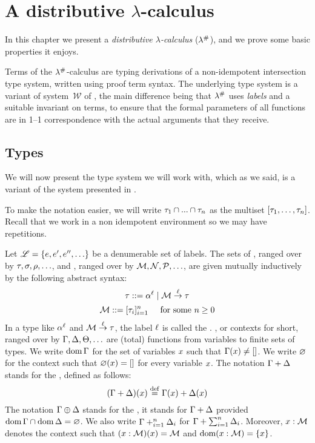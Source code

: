 \chapter{A distributive $\lambda$-calculus}

In this chapter we present a
{\em distributive $\lambda$-calculus} ($\lambda^{\mathtt{\#}}$),
and we prove some basic properties it enjoys.

Terms of the $\lambda^{\mathtt{\#}}$-calculus are typing derivations of a non-idempotent intersection type
system, written using proof term syntax.
The underlying type system is a variant of
system~$\mathcal{W}$ of \cite{bucciarelli2014inhabitation,bucciarelli2017non},
the main difference being that $\lambda^{\mathtt{\#}}$
uses {\em labels} and a suitable invariant on terms,
to ensure that the formal parameters of all functions
are in 1--1 correspondence with the actual arguments that they receive.


\section{Types}

We will now present the type system we will work with, which as we said, is a variant of the system presented
in \cite{bucciarelli2017non}.

To make the notation easier, we will write $\tau_1 \cap ... \cap \tau_n$ as the
multiset $[\tau_1, \hdots, \tau_n]$.
Recall that we work in a non idempotent environment so we may have repetitions.

\begin{definition}
Let $\mathscr{L} = \{e,e',e'',\hdots\}$ be a denumerable set of labels.
The sets of , ranged over by $\tau,\sigma,\rho,\hdots$,
and , ranged over by $\mathcal{M},\mathcal{N},\mathcal{P},\hdots$,
are given mutually inductively by the following abstract syntax:
\[
  \tau ::= \alpha^{\ell} \mid \mathcal{M} \overset{\ell}{\to} \tau
\]
\[
  \mathcal{M} ::= [\tau_i]_{i=1}^{n} \hspace{.5cm} \text{for some $n \geq 0$}
\]
In a type like $\alpha^{\ell}$ and $\mathcal{M} \overset{\ell}{\to} \tau$,
the label $\ell$ is called the .
, or contexts for short,
ranged over by $\Gamma,\Delta,\Theta,\hdots$ are (total) functions from variables to finite sets of types.
We write $\operatorname{dom}\Gamma$ for the set of variables $x$ such that $\Gamma(x) \neq []$.
We write $\varnothing$ for the context such that $\varnothing(x) = []$ for every variable $x$.
The notation $\Gamma + \Delta$ stands for the , defined as follows:
\[
    (\Gamma + \Delta)(x) \overset{\mathrm{def}}{=} \Gamma(x) + \Delta(x)
\]
The notation $\Gamma \oplus \Delta$ stands for the ,
\ie it stands for $\Gamma + \Delta$ provided $\operatorname{dom}\Gamma \cap \operatorname{dom}\Delta = \varnothing$.
We also write $\Gamma +_{i=1}^{n} \Delta_i$ for $\Gamma + \sum_{i=1}^{n} \Delta_i$.
Moreover, $x : \mathcal{M}$ denotes the context such that $(x : \mathcal{M})(x) = \mathcal{M}$
and $\operatorname{dom}(x : \mathcal{M}) = \{x\}$.
\end{definition}


